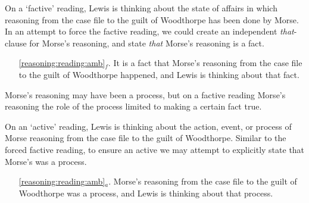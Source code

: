 \documentclass[10pt]{article}
\begin{document}
On a `factive' reading, Lewis is thinking about the state of affairs in which reasoning from the case file to the guilt of Woodthorpe has been done by Morse.
In an attempt to force the factive reading, we could create an independent \emph{that}-clause for Morse's reasoning, and state \emph{that} Morse's reasoning is a fact.
\begin{enumerate}
\item[\ref{reasoning:reading:amb}\(_{f}\).] It is a fact that Morse's reasoning from the case file to the guilt of Woodthorpe happened, and Lewis is thinking about that fact.
\end{enumerate}
Morse's reasoning may have been a process, but on a factive reading Morse's reasoning the role of the process limited to making a certain fact true.



On an `active' reading, Lewis is thinking about the action, event, or process of Morse reasoning from the case file to the guilt of Woodthorpe.
Similar to the forced factive reading, to ensure an active we may attempt to explicitly state that Morse's was a process.
\begin{enumerate}
\item[\ref{reasoning:reading:amb}\(_{a}\).] Morse's reasoning from the case file to the guilt of Woodthorpe was a process, and Lewis is thinking about that process.
\end{enumerate}

\end{document}
